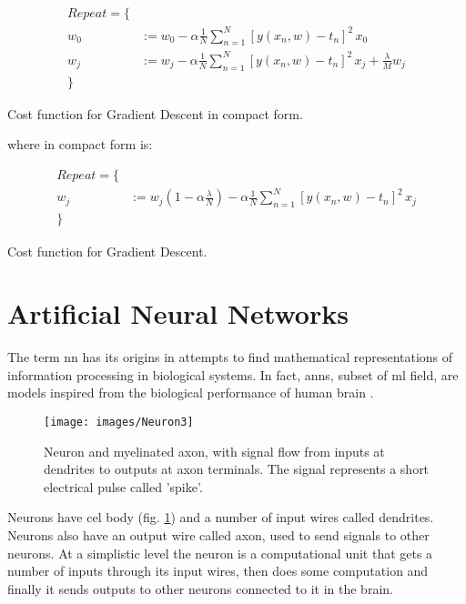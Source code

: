 \begin{Equation}[H]
	\centering
	\begin{equation} \label{eq:graddesc}
		\begin{aligned}
			Repeat = \{ \\
				w_0 &:= w_0 - \alpha \frac{1}{N} \sum_{n=1}^{N} [ y(x_n,w)-t_n ]^2 \, x_0 \\
				w_j &:= w_j - \alpha \frac{1}{N} \sum_{n=1}^{N} [ y(x_n,w)-t_n ]^2 \, x_j + \frac{\lambda}{M} w_j\\
			\}
		\end{aligned}
	\end{equation}
	\caption[Gradient Descent in compact form.]{Cost function for Gradient Descent in compact form.}
\end{Equation}

\noindent where in compact form is:
\begin{Equation}[H]
	\centering
	\begin{equation} \label{eq:graddesccompact}
	\begin{aligned}
		Repeat = \{ \\
			w_j &:= w_j(1-\alpha \frac{\lambda}{N}) - \alpha \frac{1}{N} \sum_{n=1}^{N} [ y(x_n,w)-t_n ]^2 \, x_j \\
		\}
	\end{aligned}
	\end{equation}
	\caption[Cost function for Gradient Descent.]{Cost function for Gradient Descent.}
\end{Equation}



\section{Artificial Neural Networks}
\label{sec:nn}
The term  \gls{nn} has its origins in attempts to find mathematical representations of information processing in biological systems. In fact, \glspl{ann}, subset of \gls{ml} field, are models inspired from the biological performance of human brain \cite[]{inbook}. 

\begin{figure}[H]
	\centering
	\texttt{[image: images/Neuron3]}
	\caption[Image of a human neuron.]{Neuron and myelinated axon, with signal flow from inputs at dendrites to outputs at axon terminals. The signal represents a short electrical pulse called 'spike'.}
	\label{fig:bioneuron}
\end{figure}

\noindent Neurons have cel body (fig. \ref{fig:bioneuron}) and a number of input wires called dendrites. Neurons also have an output wire called axon, used to send signals to other neurons. At a simplistic level the neuron is a computational unit that gets a number of inputs through its input wires, then does some computation and finally it sends outputs to other neurons connected to it in the brain. \\

